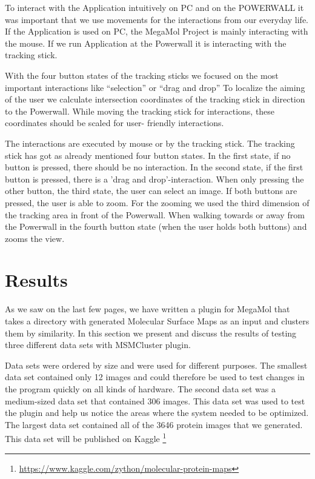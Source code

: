\documentclass[journal]{vgtc}       %
\begin{document}
To interact with the Application intuitively on PC and on the POWERWALL it was important that we use movements for the interactions from our everyday life. If the Application is used on PC, the MegaMol Project is mainly interacting with the mouse. If we run Application at the Powerwall it is interacting with the tracking stick.

With the four button states of the tracking sticks we focused on the most important interactions like ``selection'' or ``drag and drop'' To localize the aiming of the user  we  calculate  intersection coordinates of the tracking stick in direction to the Powerwall. While moving the tracking stick for interactions, these coordinates should be scaled for  user- friendly interactions.

The interactions are executed by mouse or by the tracking stick. The tracking stick has  got as already mentioned four button  states. In the first state, if no button is pressed, there should be no interaction. In the second state, if the first button is pressed, there is  a 'drag and drop'-interaction. When only  pressing the other button, the third state, the user can select an image. If both buttons are pressed, the user is able to zoom. For the zooming we used the third dimension of the tracking area in front of the Powerwall. When walking towards or away from the Powerwall in the fourth button state (when the user holds both buttons) and zooms the view. 




\section{Results}
As we saw on the last few pages, we have written a plugin for MegaMol that takes a directory with generated Molecular Surface Maps as an input and clusters  them by similarity. In this section we present and discuss the results of testing three different data sets with MSMCluster plugin. 

Data sets were ordered by size and were used for different purposes. The smallest data set contained only 12 images and could therefore be used to test changes in the program quickly on all kinds of hardware. The second data set was a medium-sized data set that contained 306 images. This data set was used to test the plugin and help us notice the areas where the system needed to be optimized. The largest data set contained all of the 3646 protein images that we generated. This data set will be published on Kaggle \footnote{\url{https://www.kaggle.com/zython/molecular-protein-maps}}
\end{document}
